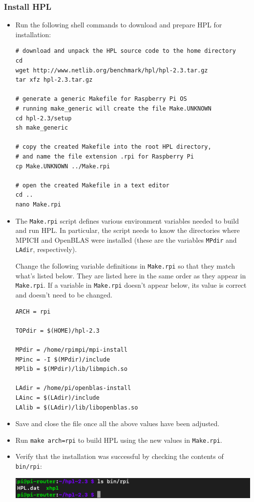 \documentclass{article}
\begin{document}
\subsubsection{Install HPL}
\begin{itemize}
    \item Run the following shell commands to download and prepare HPL for installation:
    
\begin{verbatim}
# download and unpack the HPL source code to the home directory
cd
wget http://www.netlib.org/benchmark/hpl/hpl-2.3.tar.gz
tar xfz hpl-2.3.tar.gz

# generate a generic Makefile for Raspberry Pi OS 
# running make_generic will create the file Make.UNKNOWN
cd hpl-2.3/setup
sh make_generic

# copy the created Makefile into the root HPL directory,
# and name the file extension .rpi for Raspberry Pi
cp Make.UNKNOWN ../Make.rpi

# open the created Makefile in a text editor
cd ..
nano Make.rpi
\end{verbatim}   

    \item The \texttt{Make.rpi} script defines various environment variables needed to build and run HPL. In particular, the script needs to know the directories where MPICH and OpenBLAS were installed (these are the variables \texttt{MPdir} and \texttt{LAdir}, respectively).
    
    Change the following variable definitions in \texttt{Make.rpi} so that they match what's listed below. They are listed here in the same order as they appear in \texttt{Make.rpi}. If a variable in \texttt{Make.rpi} doesn't appear below, its value is correct and doesn't need to be changed.
\begin{verbatim}
ARCH = rpi

TOPdir = $(HOME)/hpl-2.3

MPdir = /home/rpimpi/mpi-install
MPinc = -I $(MPdir)/include
MPlib = $(MPdir)/lib/libmpich.so

LAdir = /home/pi/openblas-install
LAinc = $(LAdir)/include
LAlib = $(LAdir)/lib/libopenblas.so
\end{verbatim}  

    \item Save and close the file once all the above values have been adjusted.

    \item Run \texttt{make arch=rpi} to build HPL using the new values in \texttt{Make.rpi}.
    
    \item Verify that the installation was successful by checking the contents of \texttt{bin/rpi}:
    
    \includegraphics[width=\textwidth]{images/hpl-after-building.png}
\end{itemize}
\end{document}
